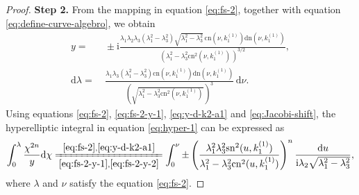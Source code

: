 \documentclass[11pt,reqno]{amsart}
\newcommand{\ii}{\mathrm{i}}
\newcommand{\sn}{\mathrm{sn}}
\newcommand{\cn}{\mathrm{cn}}
\newcommand{\dn}{\mathrm{dn}}
\newcommand{\dd}{\mathrm{d}}
\numberwithin{equation}{section}
\begin{document}
\begin{proof}
	\textbf{Step 2.}
	From the mapping in equation \eqref{eq:fs-2}, together with equation \eqref{eq:define-curve-algebro}, we obtain 
	\begin{subequations}\label{eq:fs-2-y}
		\begin{align}
			y=&\ \pm \ii \frac{\lambda_1\lambda_2\lambda_3(\lambda_1^2-\lambda_3^2)\sqrt{\lambda_1^2-\lambda_3^2}\,\cn(\nu,  k^{(1)}_1)\dn(\nu,  k^{(1)}_1)}{\left(\lambda_1^2-\lambda_3^2\cn^2(\nu,  k^{(1)}_1)\,\right)^{3/2}},  \label{eq:fs-2-y-1} \\
			\dd \lambda=&\ \frac{\lambda_1\lambda_3(\lambda_1^2-\lambda_3^2) \cn(\nu,  k^{(1)}_1)\dn(\nu,  k^{(1)}_1)}{\left(\sqrt{\lambda_1^2-\lambda_3^2\cn^2(\nu,  k^{(1)}_1)}\,\right)^3}\, \dd \nu .  \label{eq:fs-2-y-2}
		\end{align}
	\end{subequations}
	Using equations \eqref{eq:fs-2}, \eqref{eq:fs-2-y-1}, \eqref{eq:y-d-k2-a1} and \eqref{eq:Jacobi-shift}, the hyperelliptic integral in equation \eqref{eq:hyper-1} can be expressed as 
	\begin{equation}\label{eq:elliptic-funda-1}
		\int_{0}^{\lambda} \frac{ \chi^{2n} }{y} \dd  \chi \xlongequal[\eqref{eq:fs-2-y-1},\eqref{eq:fs-2-y-2}]{\eqref{eq:fs-2},\eqref{eq:y-d-k2-a1}}  \int_{0}^{\nu} \pm   \left(\frac{\lambda_1^2\lambda_3^2\sn^2(u,  k^{(1)}_1)}{\lambda_1^2-\lambda_3^2\cn^2(u,  k^{(1)}_1)}\right)^n\frac{\dd u}{\ii \lambda_2\sqrt{\lambda_1^2-\lambda_3^2}},
	\end{equation}
	where $\lambda$ and $\nu$ satisfy the equation \eqref{eq:fs-2}.
	

\end{proof}
\end{document}
